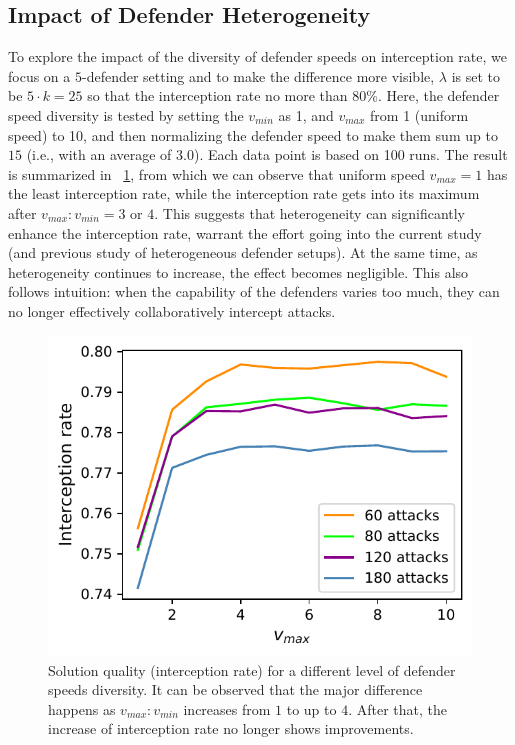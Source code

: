 \subsection{Impact of Defender Heterogeneity}
To explore the impact of the diversity of defender speeds on interception rate, we focus on a $5$-defender setting and to make the difference more visible, 
$\lambda$ is set to be $5\cdot k = 25$ so that the interception rate no more than 80\%. 
Here, the defender speed diversity is tested by setting the $v_{min}$ as 1, and $v_{max}$ from 1 (uniform speed) to 10, 
and then normalizing the defender speed to make them sum up to $15$ (i.e., with an average of $3.0$). 
Each data point is based on 100 runs. The result is summarized in ~\ref{fig:bd-heterogeneity}, 
from which we can observe that uniform speed $v_{max} = 1$ has the least interception rate, 
while the interception rate gets into its maximum after $v_{max}:v_{min} = 3$ or $4$. 
This suggests that heterogeneity can significantly enhance the interception rate, 
warrant the effort going into the current study (and previous study of heterogeneous defender setups). 
At the same time, as heterogeneity continues to increase, the effect becomes negligible. 
This also follows intuition: when the capability of the defenders varies too much, 
they can no longer effectively collaboratively intercept attacks. 

\begin{figure}[h!]
    \centering
    \includegraphics[width=0.5\linewidth]{chapters/bd/fig/heterogeneity.pdf}
    \caption{Solution quality (interception rate) for a different level of defender speeds diversity. It can be observed that the major difference happens as $v_{max}:v_{min}$ increases from $1$ to up to $4$. After that, the increase of interception rate no longer shows improvements.}
    \label{fig:bd-heterogeneity}
    \vspace{-2mm}
\end{figure}

